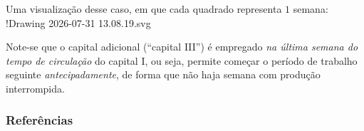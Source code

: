 Uma visualização desse caso, em que cada quadrado representa $1$ semana:
!Drawing 2026-07-31 13.08.19.svg

Note-se que o capital adicional (``capital III'') é empregado \textit{na última semana do tempo de circulação} do capital I, ou seja, permite começar o período de trabalho seguinte \textit{antecipadamente}, de forma que não haja semana com produção interrompida. 

\subsubsection{Referências}
